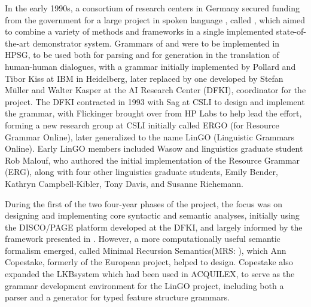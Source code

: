 \documentclass[output=paper
 	        ,biblatex
                ,babelshorthands
                ,newtxmath
                ,draftmode
                ,colorlinks, citecolor=brown
]{langscibook}
\begin{document}
In the early 1990s, a consortium of research centers in Germany secured funding from the  government for a large project in spoken language , called \verbmobil \citep{Wahlster2000a-ed}, which aimed to combine a variety of methods and frameworks in a single implemented state-of-the-art demonstrator system.  Grammars of  and  were to be implemented in HPSG, to be used both for parsing and for generation in the translation of human-human dialogues, with a  grammar initially implemented by Pollard and Tibor Kiss at IBM in Heidelberg, later replaced by one developed by Stefan Müller and Walter Kasper at the  AI Research Center (DFKI), coordinator for the \verbmobil project.  The DFKI contracted in 1993 with Sag at CSLI to design and implement the  grammar, with Flickinger brought over from HP Labs to help lead the effort, forming a new research group at CSLI initially called ERGO (for  Resource Grammar Online), later generalized to the name LinGO (Linguistic Grammars Online).  Early LinGO members included Wasow and linguistics graduate student Rob Malouf, who authored the initial implementation of the  Resource Grammar (ERG), along with four other linguistics graduate students, Emily Bender, Kathryn Campbell-Kibler, Tony Davis, and Susanne Riehemann.

During the first of the two four-year phases of the \verbmobil project, the focus was on designing and implementing core syntactic and semantic analyses, initially using the DISCO/PAGE platform \citep{DISCO94} developed at the DFKI, and largely informed by the framework presented in \citet{ps2}.  However, a more computationally useful semantic formalism emerged, called Minimal Recursion Semantics\indexmrs (MRS: \citealt*{CFPS2005a}), which Ann Copestake, formerly of the European  project, helped to design.  Copestake also expanded the LKB\indexlkb system \citep{Copestake2002a} which had been used in ACQUILEX, to serve as the grammar development environment for the LinGO project, including both a parser and a generator for typed feature structure grammars.
\end{document}
